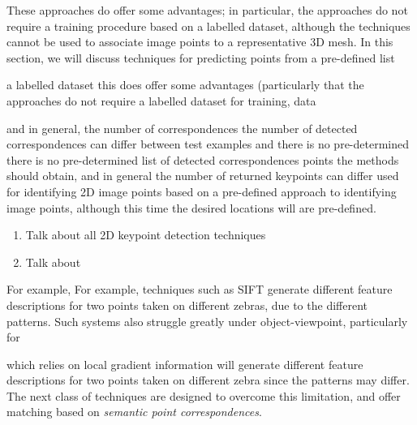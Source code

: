 These approaches do offer some advantages; in particular, the approaches do not require a training procedure based on a labelled dataset, although the techniques cannot be used to associate image points to a representative 3D mesh. In this section, we will discuss techniques for predicting points from a pre-defined list 

a labelled dataset this does offer some advantages (particularly that the approaches do not require a labelled dataset for training, data 

and in general, the number of correspondences the number of detected correspondences can differ between test examples and there is no pre-determined there is no pre-determined list of detected correspondences points the methods should obtain, and in general the number of returned keypoints can differ  used for identifying 2D image points based on a pre-defined   approach to identifying image points, although this time the desired locations will are pre-defined.

\begin{enumerate}
    \item Talk about all 2D keypoint detection techniques
    \item Talk about 
\end{enumerate}



For example, For example, techniques such as SIFT generate different feature descriptions for two points taken on different zebras, due to the different patterns. Such systems also struggle greatly under object-viewpoint, particularly for 

which relies on local gradient information will generate different feature descriptions for two points taken on different zebra since the patterns may differ. The next class of techniques are designed to overcome this limitation, and offer matching based on \emph{semantic point correspondences}.






